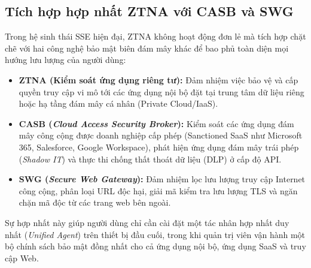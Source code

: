 \subsection{Tích hợp hợp nhất ZTNA với CASB và SWG}
\label{subsec:5_4_2}

Trong hệ sinh thái SSE hiện đại, ZTNA không hoạt động đơn lẻ mà tích hợp chặt chẽ với hai công nghệ bảo mật biên đám mây khác để bao phủ toàn diện mọi hướng lưu lượng của người dùng:

\begin{itemize}
    \item \textbf{ZTNA (Kiểm soát ứng dụng riêng tư):} Đảm nhiệm việc bảo vệ và cấp quyền truy cập vi mô tới các ứng dụng nội bộ đặt tại trung tâm dữ liệu riêng hoặc hạ tầng đám mây cá nhân (Private Cloud/IaaS).
    \item \textbf{CASB (\textit{Cloud Access Security Broker}):} Kiểm soát các ứng dụng đám mây công cộng được doanh nghiệp cấp phép (Sanctioned SaaS như Microsoft 365, Salesforce, Google Workspace), phát hiện ứng dụng đám mây trái phép (\textit{Shadow IT}) và thực thi chống thất thoát dữ liệu (DLP) ở cấp độ API.
    \item \textbf{SWG (\textit{Secure Web Gateway}):} Đảm nhiệm lọc lưu lượng truy cập Internet công cộng, phân loại URL độc hại, giải mã kiểm tra lưu lượng TLS và ngăn chặn mã độc từ các trang web bên ngoài.
\end{itemize}

Sự hợp nhất này giúp người dùng chỉ cần cài đặt một tác nhân hợp nhất duy nhất (\textit{Unified Agent}) trên thiết bị đầu cuối, trong khi quản trị viên vận hành một bộ chính sách bảo mật đồng nhất cho cả ứng dụng nội bộ, ứng dụng SaaS và truy cập Web.

